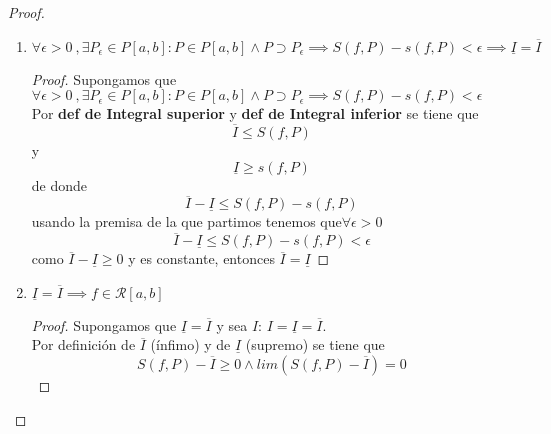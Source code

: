 \documentclass{article}
\begin{document}
\begin{proof}
\begin{enumerate}
\begin{proof}
\end{proof}
\item \(\forall \epsilon>0\ ,  \exists P_\epsilon \in P[a, b]: P \in P[a, b] \wedge P \supset P_\epsilon \implies S(f, P) - s(f, P) < \epsilon \implies \underline{I} = \overline{I}\)
\begin{proof}
Supongamos que \(\forall \epsilon>0\ ,  \exists P_\epsilon \in P[a, b]: P \in P[a, b] \wedge P \supset P_\epsilon \implies S(f, P) - s(f, P) < \epsilon\)\\

Por \textbf{def de Integral superior} y \textbf{def de Integral inferior} se tiene que
\[
 \overline{I} \leq S(f, P) 
\]
y
\[
 \underline{I} \geq s(f, P)
\]
de donde 
\[
 \overline{I}  -  \underline{I} \leq S(f,P) - s(f,P) 
\]
usando la premisa de la que partimos tenemos que\( \forall \epsilon > 0\)
\[
 \overline{I}  -  \underline{I} \leq S(f,P) - s(f,P) < \epsilon
\]
como \(\overline{I}  -  \underline{I} \geq 0\) y es constante, entonces \(\overline{I} = \underline{I}\)


\end{proof}

\item \(\underline{I} = \overline{I} \implies f \in \mathcal{R}[a, b]\)\\
\begin{proof}

Supongamos que  \(\underline{I} = \overline{I}\) y sea \(I\): \(I = \underline{I} = \overline{I}\).\\

Por definición de \(\overline{I}\) (ínfimo) y de \(\underline{I}\) (supremo) se tiene que 
\[
S(f, P) - \overline{I} \geq 0 \wedge lim (S(f, P) - \overline{I}) = 0
\]


\end{proof}
\end{enumerate}
\end{proof}
\end{document}
